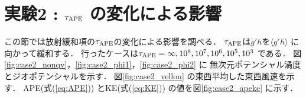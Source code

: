 \documentclass[a4j,12pt,openbib,oneside]{jreport}
\begin{document}
\section{実験2 : $\tau_{\rm{APE}}$ の変化による影響}
\label{sec:case2}
この節では放射緩和項の$\tau_{\rm{APE}}$の変化による影響を調べる．
$\tau_{\rm{APE}}$は$g'h$を$\langle g'h \rangle $ に向かって緩和する．
行ったケースは$\tau_{\rm{APE}} = \infty, 10^8, 10^7, 10^6, 10^5, 10^3$ である．
%
%
%
図\ref{fig:case2_nonqv}，\ref{fig:case2_phi1}，\ref{fig:case2_phi2} に
無次元ポテンシャル渦度とジオポテンシャルを示す．
%
%
%
図\ref{fig:case2_vellon} の東西平均した東西風速を示す．
%
APE(式(\ref{eq:APE})) とKE(式(\ref{eq:KE})) の値を図\ref{fig:case2_apeke} に示す．
%
\end{document}
